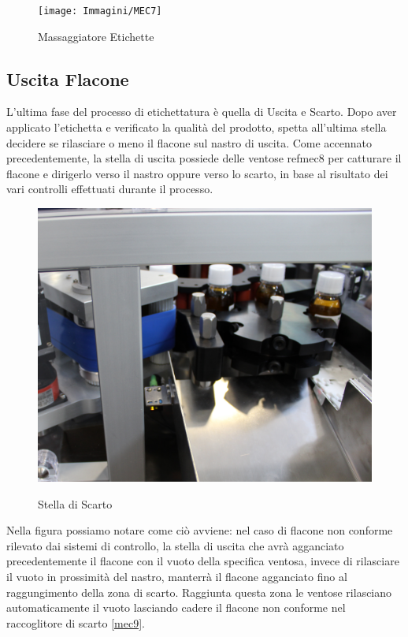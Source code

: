 \documentclass[12pt, a4paper, oneside]{book}
\begin{document}
\begin{figure}[H]
	\centering
	\texttt{[image: Immagini/MEC7]}
	\label{MEC7}
	\caption{ Massaggiatore Etichette }
\end{figure}

\subsection{Uscita Flacone}
L'ultima fase del processo di etichettatura è quella di Uscita e Scarto. Dopo aver applicato l'etichetta e verificato la qualità del prodotto, spetta all'ultima stella decidere se rilasciare o meno il flacone sul nastro di uscita. Come accennato precedentemente, la stella di uscita possiede delle ventose ref{mec8} per catturare il flacone e dirigerlo verso il nastro oppure verso lo scarto, in base al risultato dei vari controlli effettuati durante il processo.

\begin{figure}[H]
	\centering
	\includegraphics[width=12cm]{Immagini/MEC8}
	\label{mec8}
	\caption{ Stella di Scarto }
\end{figure}

Nella figura possiamo notare come ciò avviene: nel caso di flacone non conforme rilevato dai sistemi di controllo, la stella di uscita che avrà agganciato precedentemente il flacone con il vuoto della specifica ventosa, invece di rilasciare il vuoto in prossimità del nastro, manterrà il flacone agganciato fino al raggungimento della zona di scarto. Raggiunta questa zona le ventose rilasciano automaticamente il vuoto lasciando cadere il flacone non conforme nel raccoglitore di scarto \ref{mec9}. 
\end{document}

